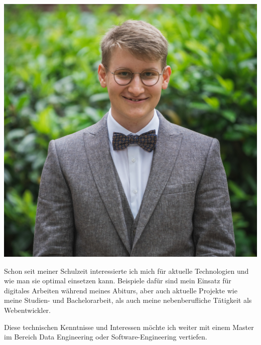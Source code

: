 \documentclass[9pt]{developercv} %
\begin{document}
\begin{minipage}[t]{0.375\textwidth} %
	\vspace{-\baselineskip} %

    \includegraphics[width=\textwidth]{data/images/DSC02105-2.jpg}
\end{minipage}

\vspace{0.5cm}



Schon seit meiner Schulzeit interessierte ich mich für aktuelle Technologien und wie man sie optimal einsetzen kann. Beispiele dafür sind mein Einsatz für digitales Arbeiten während meines Abiturs, aber auch aktuelle Projekte wie meine Studien- und Bachelorarbeit, als auch meine nebenberufliche Tätigkeit als Webentwickler.

\vspace{0.2cm}

Diese technischen Kenntnisse und Interessen möchte ich weiter mit einem Master im Bereich Data Engineering oder Software-Engineering vertiefen.
\end{document}
